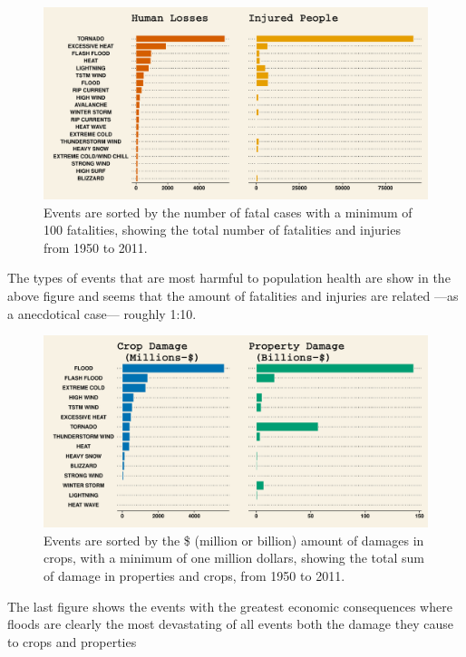 \documentclass[12pt,spanish, american,b4paper, onecolumn, lmargin=1cm, rmargin=1cm, tmargin=1cm, bmargin=2cm,]{article}
\begin{document}
\begin{figure}[htbp]
\centering
\includegraphics{./proj2_files/figure-latex/ThePlotOne.pdf}
\caption{Events are sorted by the number of fatal cases with a minimum
of 100 fatalities, showing the total number of fatalities and injuries
from 1950 to 2011.}
\end{figure}

The types of events that are most harmful to population health are show
in the above figure and seems that the amount of fatalities and injuries
are related ---as a anecdotical case--- roughly 1:10.

\begin{figure}[htbp]
\centering
\includegraphics{./proj2_files/figure-latex/ThePlotTwo.pdf}
\caption{Events are sorted by the \$ (million or billion) amount of
damages in crops, with a minimum of one million dollars, showing the
total sum of damage in properties and crops, from 1950 to 2011.}
\end{figure}

The last figure shows the events with the greatest economic consequences
where floods are clearly the most devastating of all events both the
damage they cause to crops and properties

\newpage
\end{document}
